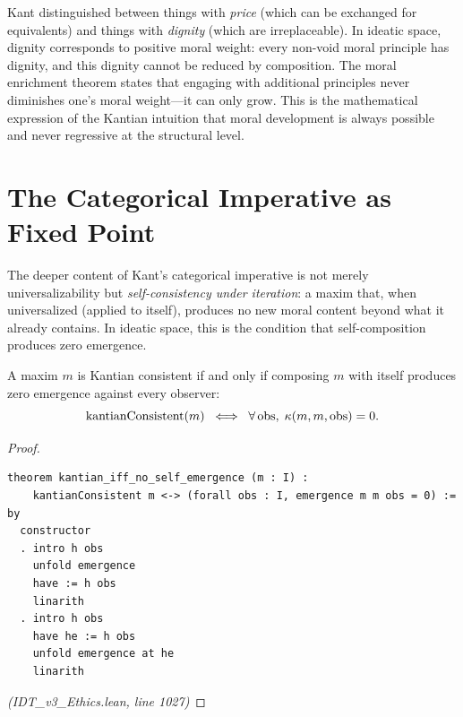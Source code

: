 \begin{interpretation}
Kant distinguished between things with \emph{price} (which can be exchanged for
equivalents) and things with \emph{dignity} (which are irreplaceable). In
ideatic space, dignity corresponds to positive moral weight: every non-void
moral principle has dignity, and this dignity cannot be reduced by composition.
The moral enrichment theorem states that engaging with additional principles
never diminishes one's moral weight---it can only grow. This is the mathematical
expression of the Kantian intuition that moral development is always possible
and never regressive at the structural level.
\end{interpretation}

\section{The Categorical Imperative as Fixed Point}
\label{sec:categorical-fixed-point}

The deeper content of Kant's categorical imperative is not merely
universalizability but \emph{self-consistency under iteration}: a maxim
that, when universalized (applied to itself), produces no new moral content
beyond what it already contains. In ideatic space, this is the condition
that self-composition produces zero emergence.

\begin{theorem}
\label{thm:kantian-zero-emergence}
A maxim $m$ is Kantian consistent if and only if composing $m$ with itself
produces zero emergence against every observer:
\[
  \mathrm{kantianConsistent}(m) \;\iff\; \forall\, \mathrm{obs},\; \kappa(m, m, \mathrm{obs}) = 0.
\]
\end{theorem}

\begin{proof}
\begin{lstlisting}
theorem kantian_iff_no_self_emergence (m : I) :
    kantianConsistent m <-> (forall obs : I, emergence m m obs = 0) := by
  constructor
  . intro h obs
    unfold emergence
    have := h obs
    linarith
  . intro h obs
    have he := h obs
    unfold emergence at he
    linarith
\end{lstlisting}
\textit{(IDT\_v3\_Ethics.lean, line 1027)}
\end{proof}

